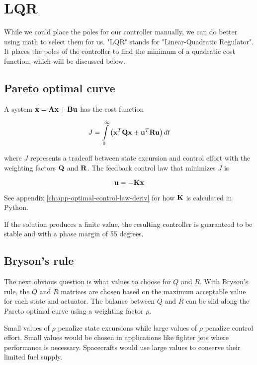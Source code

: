 \section{LQR}

While we could place the poles for our controller manually, we can do better
using math to select them for us. "LQR" stands for "Linear-Quadratic Regulator".
It places the poles of the controller to find the minimum of a quadratic cost
function, which will be discussed below.

\subsection{Pareto optimal curve}

A system $\dot{\mathbf{x}} = \mathbf{A}\mathbf{x} + \mathbf{B}\mathbf{u}$ has the cost function

\begin{equation*}
  J = \int\limits_0^\infty \left(\mathbf{x}^T\mathbf{Q}\mathbf{x} +
    \mathbf{u}^T\mathbf{R}\mathbf{u}\right) dt
\end{equation*}

where $J$ represents a tradeoff between \gls{state} excursion and control effort
with the weighting factors $\mathbf{Q}$ and $\mathbf{R}$. The feedback
\gls{control law} that minimizes $J$ is

\begin{equation*}
  \mathbf{u} = -\mathbf{K}\mathbf{x}
\end{equation*}

See appendix \ref{ch:app-optimal-control-law-deriv} for how $\mathbf{K}$ is
calculated in Python.

If the solution produces a finite value, the resulting controller is guaranteed
to be stable and  with a \gls{phase margin} of 55
degrees.

\subsection{Bryson's rule}

The next obvious question is what values to choose for $Q$ and $R$. With
Bryson's rule, the $Q$ and $R$ matrices are chosen based on the maximum
acceptable value for each \gls{state} and actuator. The balance between $Q$ and
$R$ can be slid along the Pareto optimal curve using a weighting factor $\rho$.

Small values of $\rho$ penalize \gls{state} excursions while large values of
$\rho$ penalize control effort. Small values would be chosen in applications
like fighter jets where performance is necessary. Spacecrafts would use large
values to conserve their limited fuel supply.
